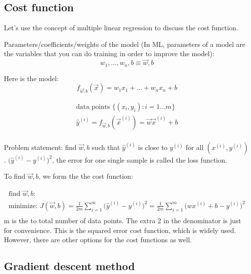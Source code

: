 \documentclass[12pt]{report}
\begin{document}
\subsection{Cost function}
\label{sec:cost}
Let's use the concept of multiple linear regression to discuss the cost function.

Parameters/coefficients/weights of the model (In ML, parameters of a model are the variables that you can do training in order to improve the model):
\begin{equation}
  w_1, . . . , w_n , b \equiv \overrightarrow{w} ,b
\end{equation}

Here is the model:
\begin{equation}
	f_{\overrightarrow{w},b} (\overrightarrow{x}) = w_1x_1 +  ... + w_nx_n + b
\end{equation}

\begin{multline}
		\text{data points } \{(x_i, y_i): i=1 ... m \} \\
    \hat{y}^{(i)} = f_{\overrightarrow{w},b} (\overrightarrow{x}^{(i)})  = \overrightarrow{w} \overrightarrow{x} ^ {(i)} + b \\
\end{multline}

Problem statement: find $\overrightarrow{w},b$ such that $\hat{y}^{(i)}$ is close to $y^{(i)}$ for all $(x^{(i)}, y^{(i)} )$. $\big(\hat{y}^{(i)}  - y^{(i)} \big) ^2$, the error for one single sample is called the loss function.

To find $\overrightarrow{w},b$, we form the the cost function:

\begin{multline}
	\text{find $\overrightarrow{w},b$:} \\
	\text{minimize:  }  J(\overrightarrow{w},b) = \frac{1}{2m} \sum_{i=1}^{m} \big(\hat{y}^{(i)}  - y^{(i)} \big) ^2 = \frac{1}{2m} \sum_{i=1}^{m} \big( wx ^ {(i)} + b - y^{(i)} \big) ^2 \\
\end{multline}
m is the to total number of data points. The extra 2 in the denominator is just for convenience. This is the squared error cost function, which is widely used. However, there are other options for the cost functions as well.

\subsection{Gradient descent method}
\label{sec:gradient}
\end{document}
